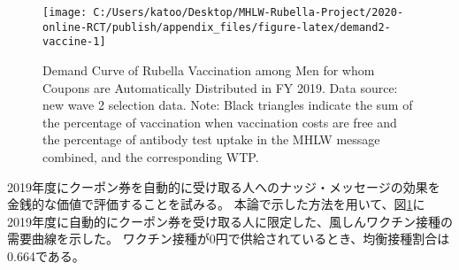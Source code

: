 \documentclass[
  11pt,
  a4paper,
]{article}
\begin{document}
\begin{figure}[t]
\texttt{[image: C:/Users/katoo/Desktop/MHLW-Rubella-Project/2020-online-RCT/publish/appendix\_files/figure-latex/demand2-vaccine-1]} \caption{Demand Curve of Rubella Vaccination among Men for whom Coupons are Automatically Distributed in FY 2019. Data source: new wave 2 selection data. Note: Black triangles indicate the sum of the percentage of vaccination when vaccination costs are free and the percentage of antibody test uptake in the MHLW message combined, and the corresponding WTP.}\label{fig:demand2-vaccine}
\end{figure}

2019年度にクーポン券を自動的に受け取る人へのナッジ・メッセージの効果を
金銭的な価値で評価することを試みる。
本論で示した方法を用いて、図\ref{fig:demand2-vaccine}に
2019年度に自動的にクーポン券を受け取る人に限定した、風しんワクチン接種の需要曲線を示した。
ワクチン接種が0円で供給されているとき、均衡接種割合は0.664である。
\end{document}

